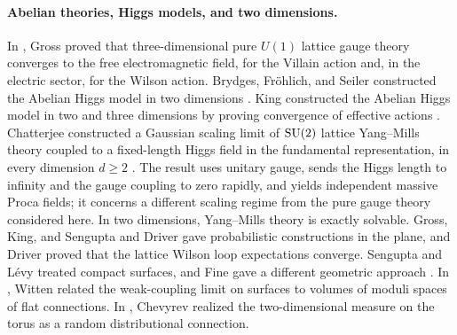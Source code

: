 \paragraph{Abelian theories, Higgs models, and two dimensions.}
In \cite{Gross1983Abelian}, Gross proved that three-dimensional pure $U(1)$ lattice gauge theory converges to the free electromagnetic field, for the Villain action and, in the electric sector, for the Wilson action. Brydges, Fr\"ohlich, and Seiler constructed the Abelian Higgs model in two dimensions \cite{Brydges1979a,Brydges1979b,Brydges1980,Brydges1981}. King constructed the Abelian Higgs model in two and three dimensions by proving convergence of effective actions \cite{King1986a,King1986b}. Chatterjee constructed a Gaussian scaling limit of $\mathrm{SU}(2)$ lattice Yang--Mills theory coupled to a fixed-length Higgs field in the fundamental representation, in every dimension $d\ge2$ \cite{Chatterjee2026HiggsScaling}. The result uses unitary gauge, sends the Higgs length to infinity and the gauge coupling to zero rapidly, and yields independent massive Proca fields; it concerns a different scaling regime from the pure gauge theory considered here. In two dimensions, Yang--Mills theory is exactly solvable. Gross, King, and Sengupta \cite{Gross1989} and Driver \cite{Driver1989} gave probabilistic constructions in the plane, and Driver proved that the lattice Wilson loop expectations converge. Sengupta \cite{Sengupta1992,Sengupta1993,Sengupta1997} and L\'evy \cite{Levy2003,Levy2010} treated compact surfaces, and Fine gave a different geometric approach \cite{Fine1990,Fine1991}. In \cite{Witten1991}, Witten related the weak-coupling limit on surfaces to volumes of moduli spaces of flat connections. In \cite{Chevyrev2019}, Chevyrev realized the two-dimensional measure on the torus as a random distributional connection.

